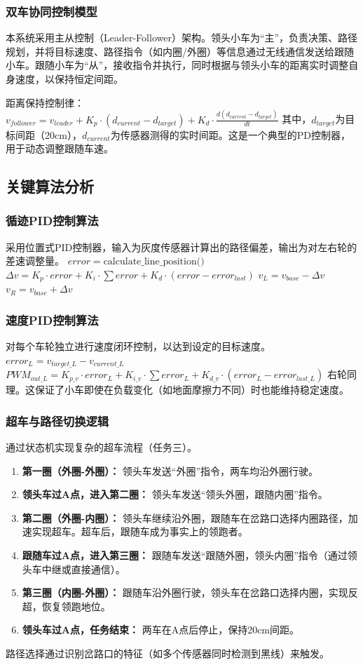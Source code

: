 \documentclass[UTF8]{ctexart}
\begin{document}
\subsubsection{双车协同控制模型}
本系统采用主从控制（Leader-Follower）架构。领头小车为``主''，负责决策、路径规划，并将目标速度、路径指令（如内圈/外圈）等信息通过无线通信发送给跟随小车。跟随小车为``从''，接收指令并执行，同时根据与领头小车的距离实时调整自身速度，以保持恒定间距。

距离保持控制律：
$v_{follower} = v_{leader} + K_p \cdot (d_{current} - d_{target}) + K_d \cdot \frac{d(d_{current} - d_{target})}{dt}$
其中，$d_{target}$为目标间距（20cm），$d_{current}$为传感器测得的实时间距。这是一个典型的PD控制器，用于动态调整跟随车速。

\subsection{关键算法分析}

\subsubsection{循迹PID控制算法}
采用位置式PID控制器，输入为灰度传感器计算出的路径偏差，输出为对左右轮的差速调整量。
$error = \text{calculate\_line\_position()}$
$\Delta v = K_p \cdot error + K_i \cdot \sum error + K_d \cdot (error - error_{last})$
$v_L = v_{base} - \Delta v$
$v_R = v_{base} + \Delta v$

\subsubsection{速度PID控制算法}
对每个车轮独立进行速度闭环控制，以达到设定的目标速度。
$error_L = v_{target\_L} - v_{current\_L}$
$PWM_{out\_L} = K_{p\_v} \cdot error_L + K_{i\_v} \cdot \sum error_L + K_{d\_v} \cdot (error_L - error_{last\_L})$
右轮同理。这保证了小车即使在负载变化（如地面摩擦力不同）时也能维持稳定速度。

\subsubsection{超车与路径切换逻辑}
通过状态机实现复杂的超车流程（任务三）。
\begin{enumerate}
    \item \textbf{第一圈（外圈-外圈）：} 领头车发送``外圈''指令，两车均沿外圈行驶。
    \item \textbf{领头车过A点，进入第二圈：} 领头车发送``领头外圈，跟随内圈''指令。
    \item \textbf{第二圈（外圈-内圈）：} 领头车继续沿外圈，跟随车在岔路口选择内圈路径，加速实现超车。超车后，跟随车成为事实上的领跑者。
    \item \textbf{跟随车过A点，进入第三圈：} 跟随车发送``跟随外圈，领头内圈''指令（通过领头车中继或直接通信）。
    \item \textbf{第三圈（内圈-外圈）：} 跟随车沿外圈行驶，领头车在岔路口选择内圈，实现反超，恢复领跑地位。
    \item \textbf{领头车过A点，任务结束：} 两车在A点后停止，保持20cm间距。
\end{enumerate}
路径选择通过识别岔路口的特征（如多个传感器同时检测到黑线）来触发。
\end{document}
